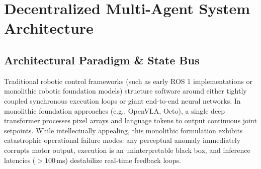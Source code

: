 \documentclass[journal]{IEEEtran}
\begin{document}
\begin{table}[!t]
\centering
\caption{Mass Distribution and Principal Inertia Parameters for Dynamic Modeling}
\label{table_dynamics_params}
\footnotesize
{}
\end{table}

\section{Decentralized Multi-Agent System Architecture}

\subsection{Architectural Paradigm \& State Bus}
Traditional robotic control frameworks (such as early ROS 1 implementations or monolithic robotic foundation models) structure software around either tightly coupled synchronous execution loops or giant end-to-end neural networks. In monolithic foundation approaches (e.g., OpenVLA, Octo), a single deep transformer processes pixel arrays and language tokens to output continuous joint setpoints. While intellectually appealing, this monolithic formulation exhibits catastrophic operational failure modes: any perceptual anomaly immediately corrupts motor output, execution is an uninterpretable black box, and inference latencies ($>100$\,ms) destabilize real-time feedback loops.
\end{document}
